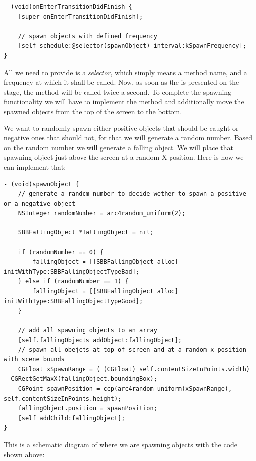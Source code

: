 \begin{lstlisting}
- (void)onEnterTransitionDidFinish {
    [super onEnterTransitionDidFinish];
    
    // spawn objects with defined frequency
    [self schedule:@selector(spawnObject) interval:kSpawnFrequency];
}
\end{lstlisting}

All we need to provide is a \textit{selector}, which simply means a method
name, and a frequency at which it shall be called. Now, as soon as the
 is presented on the stage, the
 method will be called twice a second.
To complete the spawning functionality we will have to implement the
 method and additionally move the spawned objects from
the top of the screen to the bottom.

We want to randomly spawn either positive objects that should be caught or
negative ones that should not, for that we will generate a random number. Based
on the random number we will generate a falling object. We will place that
spawning object just above the screen at a random X position. Here is how we can
implement that:

\begin{lstlisting}
- (void)spawnObject {
    // generate a random number to decide wether to spawn a positive or a negative object
    NSInteger randomNumber = arc4random_uniform(2);

    SBBFallingObject *fallingObject = nil;
    
    if (randomNumber == 0) {
        fallingObject = [[SBBFallingObject alloc] initWithType:SBBFallingObjectTypeBad];
    } else if (randomNumber == 1) {
        fallingObject = [[SBBFallingObject alloc] initWithType:SBBFallingObjectTypeGood];
    }
    
    // add all spawning objects to an array
    [self.fallingObjects addObject:fallingObject];
    // spawn all obejcts at top of screen and at a random x position with scene bounds
    CGFloat xSpawnRange = ( (CGFloat) self.contentSizeInPoints.width) - CGRectGetMaxX(fallingObject.boundingBox);
    CGPoint spawnPosition = ccp(arc4random_uniform(xSpawnRange), self.contentSizeInPoints.height);
    fallingObject.position = spawnPosition;
    [self addChild:fallingObject];
}
\end{lstlisting}

This is a schematic diagram of where we are spawning objects with the code shown
above:

